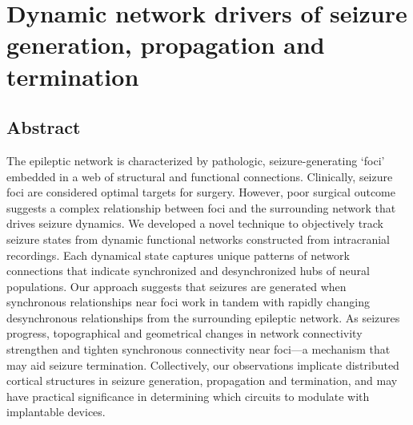 \chapter{Dynamic network drivers of seizure generation, propagation and termination}
\label{ch:netdrivers}

\ifpdf
    \graphicspath{{chapters/ch3_figures/PNG/}{chapters/ch3_figures/PDF/}{chapters/ch3_figures/}}
\else
    \graphicspath{{chapters/ch3_figures/EPS/}{chapters/ch3_figures/}}
\fi


\section{Abstract}
The epileptic network is characterized by pathologic, seizure-generating `foci' embedded in a web of structural and functional connections. Clinically, seizure foci are considered optimal targets for surgery. However, poor surgical outcome suggests a complex relationship between foci and the surrounding network that drives seizure dynamics. We developed a novel technique to objectively track seizure states from dynamic functional networks constructed from intracranial recordings. Each dynamical state captures unique patterns of network connections that indicate synchronized and desynchronized hubs of neural populations. Our approach suggests that seizures are generated when synchronous relationships near foci work in tandem with rapidly changing desynchronous relationships from the surrounding epileptic network. As seizures progress, topographical and geometrical changes in network connectivity strengthen and tighten synchronous connectivity near foci---a mechanism that may aid seizure termination. Collectively, our observations implicate distributed cortical structures in seizure generation, propagation and termination, and may have practical significance in determining which circuits to modulate with implantable devices.

